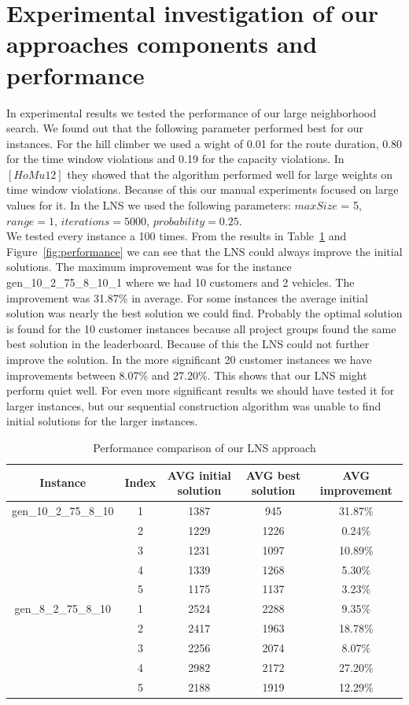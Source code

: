 \documentclass[fleqn]{scrartcl}
\begin{document}
\newpage
\section{Experimental investigation of our approaches components and performance}

In experimental results we tested the performance of our large neighborhood search. We found out that the following parameter performed best for our instances. For the hill climber we used a wight of 0.01 for the route duration, 0.80 for the time window violations and 0.19 for the capacity violations. In $[HoMu 12]$ they showed that the algorithm performed well for large weights on time window violations. Because of this our manual experiments focused on large values for it. In the LNS we used the following parameters: $maxSize$ = 5, $range = 1$, $iterations = 5000$, $probability = 0.25$.\\
We tested every instance a 100 times. From the results in Table~\ref{tab:performance} and Figure~\ref{fig:performance} we can see that the LNS could always improve the initial solutions. The maximum improvement was for the instance gen\_10\_2\_75\_8\_10\_1 where we had 10 customers and 2 vehicles. The improvement was 31.87\% in average. For some instances the average initial solution was nearly the best solution we could find. Probably the optimal solution is found for the 10 customer instances because all project groups found the same best solution in the leaderboard. Because of this the LNS could not further improve the solution. In the more significant 20 customer instances we have improvements between 8.07\% and 27.20\%. This shows that our LNS might perform quiet well. For even more significant results we should have tested it for larger instances, but our sequential construction algorithm was unable to find initial solutions for the larger instances.

\begin{table}[H]
\begin{tabular}{|c|c|c|c|c|}
\hline 
Instance & Index & AVG initial solution & AVG best solution & AVG improvement \\ 
\hline 
gen\_10\_2\_75\_8\_10 & 1 & 1387 & 945 & 31.87\% \\ 
\hline 
& 2 & 1229 & 1226 & 0.24\% \\ 
\hline 
& 3 & 1231 & 1097 & 10.89\% \\ 
\hline 
& 4 & 1339 & 1268 & 5.30\% \\ 
\hline 
& 5 & 1175 & 1137 & 3.23\% \\ 
\hline 
gen\_8\_2\_75\_8\_10 & 1 & 2524 & 2288 & 9.35\% \\ 
\hline 
& 2 & 2417 & 1963 & 18.78\% \\ 
\hline 
& 3 & 2256 & 2074 & 8.07\% \\ 
\hline 
& 4 & 2982 & 2172 & 27.20\% \\ 
\hline 
& 5 & 2188 & 1919 & 12.29\% \\ 
\hline 
\end{tabular}
\caption{Performance comparison of our LNS approach}
\label{tab:performance}
\end{table}
\end{document}
